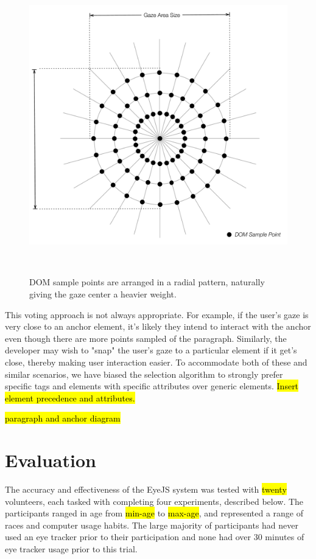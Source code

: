 \documentclass{sigchi}
\begin{document}
\begin{figure}
\centering
  \includegraphics[width=0.9\columnwidth]{figures/dom-sample-points.pdf}
  \caption{DOM sample points are arranged in a radial pattern, 
  naturally giving the gaze center a heavier weight.}~\label{fig:dom-sample-points}
\end{figure}

This voting approach is not always appropriate. For example, if the user's gaze is very close to an anchor element, it's likely they intend to interact with the anchor even though there are more points sampled of the paragraph. Similarly, the developer may wish to "snap" the user's gaze to a particular element if it get's close, thereby making user interaction easier. To accommodate both of these and similar scenarios, we have biased the selection algorithm to strongly prefer specific tags and elements with specific attributes over generic elements. \hl{Insert element precedence and attributes.}

\hl{paragraph and anchor diagram}



\section{Evaluation}
The accuracy and effectiveness of the EyeJS system was tested with \hl{twenty} volunteers, each tasked with completing four experiments, described below. The participants ranged in age from \hl{min-age} to \hl{max-age}, and represented a range of races and computer usage habits. The large majority of participants had never used an eye tracker prior to their participation and none had over 30 minutes of eye tracker usage prior to this trial.
\end{document}
